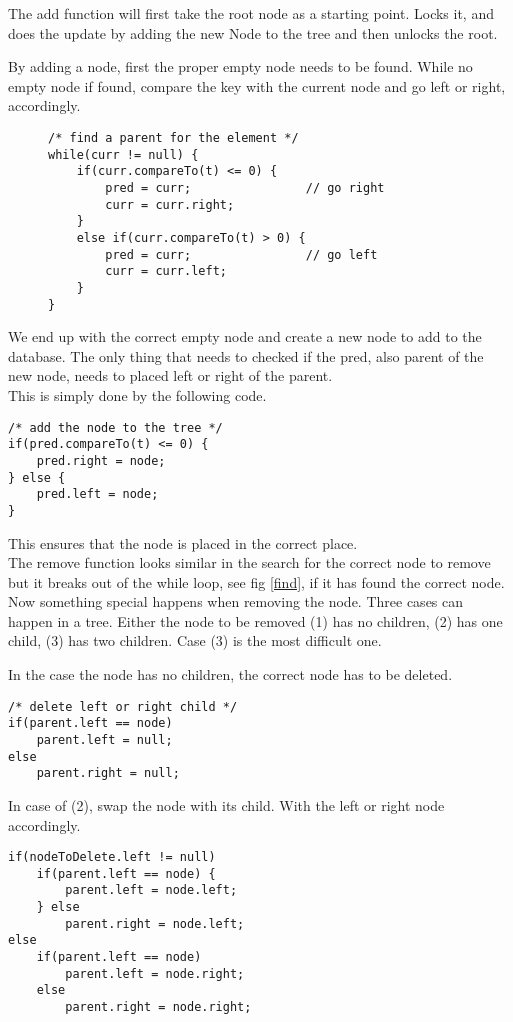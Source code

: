 \documentclass[10pt,a4paper]{article}
\begin{document}
The add function will first take the root node as a starting point. Locks it, and does the update by adding the new Node to the tree and then unlocks the root.

By adding a node, first the proper empty node needs to be found. While no empty node if found, compare the key with the current node and go left or right, accordingly. 

\begin{figure}
\center
\begin{lstlisting}
/* find a parent for the element */
while(curr != null) {
    if(curr.compareTo(t) <= 0) {
        pred = curr;				// go right
        curr = curr.right;
    }
    else if(curr.compareTo(t) > 0) {
        pred = curr;				// go left
        curr = curr.left;
    }
}
\end{lstlisting}
\label{fig:find}
\end{figure}

We end up with the correct empty node and create a new node to add to the 
database. The only thing that needs to checked if the pred, also parent of the new node, needs to placed left or right of the parent.
\\
This is simply done by the following code.
\begin{lstlisting}
/* add the node to the tree */
if(pred.compareTo(t) <= 0) {
    pred.right = node;
} else {
    pred.left = node;
}
\end{lstlisting}
This ensures that the node is placed in the correct place.
\\
The remove function looks similar in the search for the correct node to remove but it breaks out of the while loop, see fig \ref{find}, if it has found the correct node. Now something special happens when removing the node. Three cases can happen in a tree. Either the node to be removed (1) has no children, (2) has one child, (3) has two children. Case (3) is the most difficult one.

In the case the node has no children, the correct node has to be deleted.
\begin{lstlisting}
/* delete left or right child */
if(parent.left == node) 
    parent.left = null;
else
    parent.right = null;
\end{lstlisting}

In case of (2), swap the node with its child. With the left or right node accordingly.
\begin{lstlisting}
if(nodeToDelete.left != null)
    if(parent.left == node) {
        parent.left = node.left;
    } else
        parent.right = node.left;
else 
    if(parent.left == node)
        parent.left = node.right;
    else
        parent.right = node.right;
\end{lstlisting}
\end{document}
